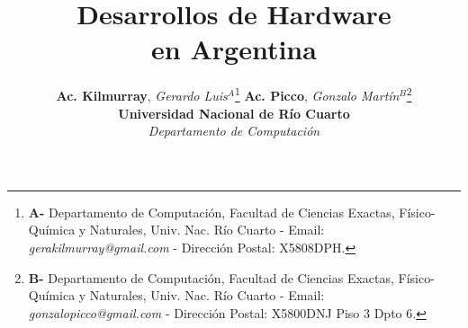 \documentclass[%
  	final,
%
	notitlepage,
	narroweqnarray,
	inline,
 	twoside,
	]{ieee}
\begin{document}
\onecolumn
\title[Hardware en Argentina]{\sffamily \textbf{Desarrollos de Hardware \\en Argentina}}
\author{\textbf{Ac. Kilmurray}, \textit{Gerardo Luis$^{A}$}\footnote{\textbf{A-} Departamento de Computaci\'on, Facultad de Ciencias Exactas, F\'isico-Qu\'imica y Naturales, Univ. Nac. R\'io Cuarto - Email: \small{\textit{gerakilmurray@gmail.com}} - Direcci\'on Postal: X5808DPH.} \hspace{4cm} \textbf{Ac. Picco}, \textit{Gonzalo Mart\'in$^{B}$}\footnote{\textbf{B-} Departamento de Computaci\'on, Facultad de Ciencias Exactas, F\'isico-Qu\'imica y Naturales, Univ. Nac. R\'io Cuarto - Email: \small{\textit{gonzalopicco@gmail.com}} - Direcci\'on Postal: X5800DNJ Piso 3 Dpto 6.}\\[1cm]
	\large \textbf{Universidad Nacional de R\'io Cuarto}\\ \textit{Departamento de Computaci\'on}\\[1cm]
	} 



\maketitle 
\sloppy
\end{document}
